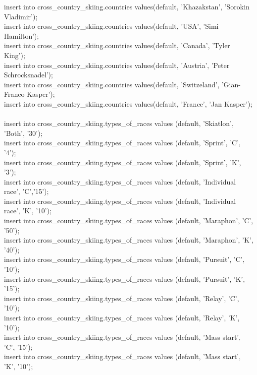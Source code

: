 \documentclass[a4paper,12pt]{article}
\begin{document}
insert into cross\_country\_skiing.countries values(default, 'Khazakstan', 'Sorokin Vladimir');\\
insert into cross\_country\_skiing.countries values(default, 'USA',  'Simi Hamilton');\\
insert into cross\_country\_skiing.countries values(default, 'Canada', 'Tyler King');\\
insert into cross\_country\_skiing.countries values(default, 'Austria',  'Peter Schrocksnadel');\\
insert into cross\_country\_skiing.countries values(default, 'Switzeland', 'Gian-Franco Kasper');\\
insert into cross\_country\_skiing.countries values(default, 'France', 'Jan Kasper');\\
\\
insert into cross\_country\_skiing.types\_of\_races values (default, 'Skiatlon', 'Both',  '30');\\
insert into cross\_country\_skiing.types\_of\_races values (default, 'Sprint', 'C', '4');\\
insert into cross\_country\_skiing.types\_of\_races values (default, 'Sprint', 'K', '3');\\
insert into cross\_country\_skiing.types\_of\_races values (default, 'Individual race',  'C','15');\\
insert into cross\_country\_skiing.types\_of\_races values (default, 'Individual race',  'K', '10');\\
insert into cross\_country\_skiing.types\_of\_races values (default, 'Maraphon', 'C', '50');\\
insert into cross\_country\_skiing.types\_of\_races values (default, 'Maraphon', 'K', '40');\\
insert into cross\_country\_skiing.types\_of\_races values (default, 'Pursuit',  'C', '10');\\
insert into cross\_country\_skiing.types\_of\_races values (default, 'Pursuit',  'K', '15');\\
insert into cross\_country\_skiing.types\_of\_races values (default, 'Relay',  'C', '10');\\
insert into cross\_country\_skiing.types\_of\_races values (default, 'Relay',  'K', '10');\\
insert into cross\_country\_skiing.types\_of\_races values (default, 'Mass start', 'C', '15');\\
insert into cross\_country\_skiing.types\_of\_races values (default, 'Mass start', 'K', '10');\\
\end{document}
